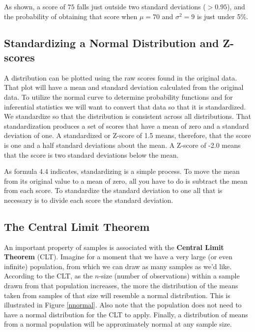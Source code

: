 \documentclass[11pt,openany]{book}\usepackage[]{graphicx}\usepackage[]{color}
\begin{document}
{\noindent As shown, a score of $75$ falls just outside two standard deviations ($>0.95$), and the probability of obtaining that score when $\mu = 70$ and $\sigma^{2} = 9$ is just under 5\%.  

\subsection{Standardizing a Normal Distribution and Z-scores}

A distribution can be plotted using the raw scores found in the original data.  That plot will have a mean and standard  deviation calculated from the original data. To utilize the normal curve to determine probability functions and for inferential statistics we will want to convert that data so that it is standardized.  We standardize so that the distribution is consistent across all distributions.  That standardization produces a set of scores that have a mean of zero and a standard deviation of one.   A standardized or Z-score of 1.5 means, therefore, that the score is one and a half standard deviations about the mean.  A Z-score of -2.0 means that the score is two standard deviations below the mean.

As formula 4.4 indicates, standardizing is a simple process.  To move the mean from its original value to a mean of zero, all you have to do is subtract the mean from each score.  To standardize the standard deviation to one all that is necessary is to divide each score the standard deviation.


\subsection{The Central Limit Theorem} 

An important property of samples is associated with the \textbf{Central Limit Theorem} (CLT). Imagine for a moment that we have a very large (or even infinite)  population, from which we can draw as many samples as we'd like. According to the CLT, as the $n$-size (number of observations) within a sample drawn from that population increases, the more the distribution of the means taken from samples of that size will resemble a normal distribution. This is illustrated in Figure \ref{nnormal}. Also note that the population does not need to have a normal distribution for the CLT to apply. Finally, a distribution of means from a normal population will be approximately normal at any sample size.  



}
\end{document}
